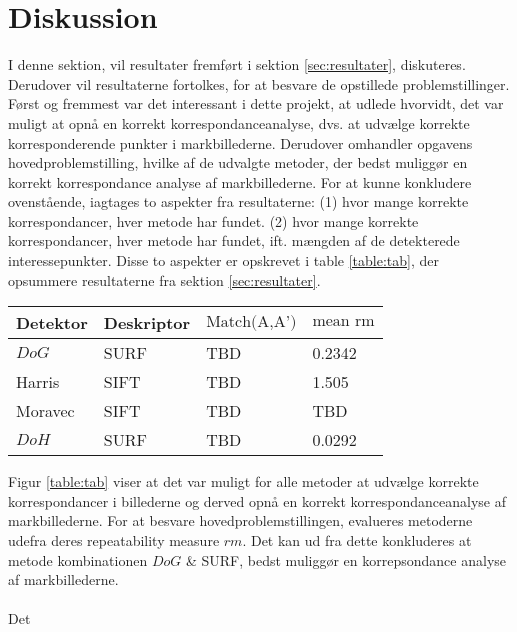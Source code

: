 \chapter{Diskussion}
I denne sektion, vil resultater fremført i sektion \ref{sec:resultater}, diskuteres. Derudover vil resultaterne fortolkes, for at besvare de opstillede problemstillinger. \\
Først og fremmest var det interessant i dette projekt, at udlede hvorvidt, det var muligt at opnå en korrekt korrespondanceanalyse, dvs. at udvælge korrekte korresponderende punkter i markbillederne. Derudover omhandler opgavens hovedproblemstilling, hvilke af de udvalgte metoder, der bedst muliggør en korrekt korrespondance analyse af markbillederne. For at kunne konkludere ovenstående, iagtages to aspekter fra resultaterne: (1) hvor mange korrekte korrespondancer, hver metode har fundet. (2) hvor mange korrekte korrespondancer, hver metode har fundet, ift. mængden af de detekterede interessepunkter. Disse to aspekter er opskrevet i table \ref{table:tab}, der opsummere resultaterne fra sektion \ref{sec:resultater}.
\begin{center}
    \begin{tabular}{ | l | l | l | l |}
    \hline
    Detektor & Deskriptor & $\text{Match(A,A')}$ & $\text{mean rm}$ \\ \hline
    $DoG$ & SURF & TBD & 0.2342 \\ \hline       
    Harris & SIFT & TBD & 1.505 \\ \hline    
    Moravec & SIFT & TBD & TBD \\ \hline    
    $DoH$ & SURF & TBD & 0.0292 \\ \hline    
    \end{tabular}
    \label{table:tab}
\end{center}
Figur \ref{table:tab} viser at det var muligt for alle metoder at udvælge korrekte korrespondancer i billederne og derved opnå en korrekt korrespondanceanalyse af markbillederne. For at besvare hovedproblemstillingen, evalueres metoderne udefra deres repeatability measure $rm$. Det kan ud fra dette konkluderes at metode kombinationen $DoG$ \& SURF, bedst muliggør en korrepsondance analyse af markbillederne. \\ \\
Det 



